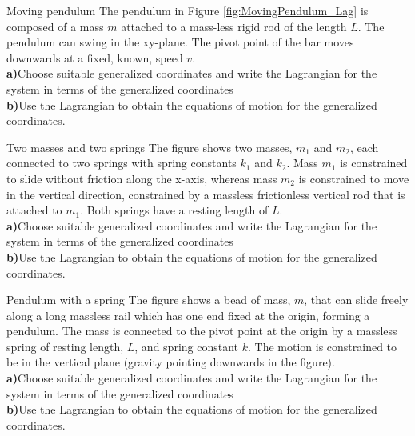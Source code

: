 \begin{problem}{Moving pendulum}
The pendulum in Figure \ref{fig:MovingPendulum_Lag} is composed of a mass $m$ attached to a mass-less rigid rod of the length $L$. The pendulum can swing in the xy-plane. The pivot point of the bar moves downwards at a fixed, known, speed $v$.
\\
\textbf{a)}Choose suitable generalized coordinates and write the Lagrangian for the system in terms of the generalized coordinates\\
\textbf{b)}Use the Lagrangian to obtain the equations of motion for the generalized coordinates.
\label{prob_Lagrange_3}
\end{problem}


\begin{problem}{Two masses and two springs}
\label{prob_Lagrange_4}
The figure shows two masses, $m_1$ and $m_2$, each connected to two springs with spring constants $k_1$ and $k_2$. Mass $m_1$ is constrained to slide without friction along the x-axis, whereas mass $m_2$ is constrained to move in the vertical direction, constrained by a massless frictionless vertical rod that is attached to $m_1$. Both springs have a resting length of $L$.
\\
\textbf{a)}Choose suitable generalized coordinates and write the Lagrangian for the system in terms of the generalized coordinates\\
\textbf{b)}Use the Lagrangian to obtain the equations of motion for the generalized coordinates.
\end{problem}

\begin{problem}{Pendulum with a spring}
\label{prob_Lagrange_5}
The figure shows a bead of mass, $m$, that can slide freely along a long massless rail which has one end fixed at the origin, forming a pendulum. The mass is connected to the pivot point at the origin by a massless spring of resting length, $L$, and spring constant $k$. The motion is constrained to be in the vertical plane (gravity pointing downwards in the figure).
\\
\textbf{a)}Choose suitable generalized coordinates and write the Lagrangian for the system in terms of the generalized coordinates\\
\textbf{b)}Use the Lagrangian to obtain the equations of motion for the generalized coordinates.
\end{problem}


